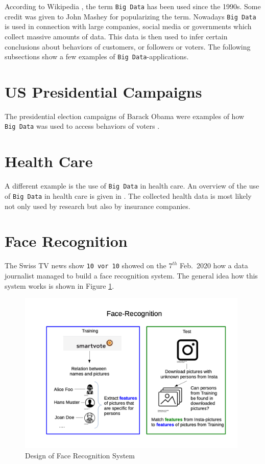 \documentclass[
]{book}
\theoremstyle{definition}
\theoremstyle{definition}
\theoremstyle{definition}
\theoremstyle{remark}
\begin{document}
According to Wikipedia \citep{Wikipedia2019}, the term \texttt{Big\ Data} has been used since the 1990s. Some credit was given to John Mashey \citep{Mashey1998} for popularizing the term. Nowadays \texttt{Big\ Data} is used in connection with large companies, social media or governments which collect massive amounts of data. This data is then used to infer certain conclusions about behaviors of customers, or followers or voters. The following subsections show a few examples of \texttt{Big\ Data}-applications.

\hypertarget{us-presidential-campaigns}{%
\section{US Presidential Campaigns}\label{us-presidential-campaigns}}

The presidential election campaigns of Barack Obama were examples of how \texttt{Big\ Data} was used to access behaviors of voters \citep{Issenberg2013}.

\hypertarget{health-care}{%
\section{Health Care}\label{health-care}}

A different example is the use of \texttt{Big\ Data} in health care. An overview of the use of \texttt{Big\ Data} in health care is given in \citep{Adibuzzaman2017}. The collected health data is most likely not only used by research but also by insurance companies.

\hypertarget{face-recognition}{%
\section{Face Recognition}\label{face-recognition}}

The Swiss TV news show \texttt{10\ vor\ 10} showed on the \(7^{th}\) Feb.~2020 how a data journalist managed to build a face recognition system. The general idea how this system works is shown in Figure \ref{fig:facerecog}.

\begin{figure}
\includegraphics[width=11cm]{odg/facerecog} \caption{Design of Face Recognition System}\label{fig:facerecog}
\end{figure}
\end{document}

